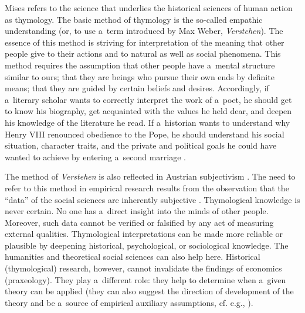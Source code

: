 Mises refers to the science that underlies the historical sciences of human action as thymology. The basic method of thymology is the so-called empathic understanding (or, to use a~term introduced by Max Weber, \textit{Verstehen}). The essence of this method is striving for interpretation of the meaning that other people give to their actions and to natural as well as social phenomena. This method requires the assumption that other people have a~mental structure similar to ours; that they are beings who pursue their own ends by definite means; that they are guided by certain beliefs and desires. Accordingly, if a~literary scholar wants to correctly interpret the work of a~poet, he should get to know his biography, get acquainted with the values he held dear, and deepen his knowledge of the literature he read. If a~historian wants to understand why Henry VIII renounced obedience to the Pope, he should understand his social situation, character traits, and the private and political goals he could have wanted to achieve by entering a~second marriage 
\parencite[][pp.264–284]{mises_theory_2007}.%




The method of \textit{Verstehen} is also reflected in Austrian subjectivism 
\parencite[][]{lachmann_legacy_1971}. %
 The need to refer to this method in empirical research results from the observation that the ``data'' of the social sciences are inherently subjective 
\parencite[][]{hayek_counter-revolution_1952}.%
Thymological knowledge is never certain. No one has a~direct insight into the minds of other people. Moreover, such data cannot be verified or falsified by any act of measuring external qualities. Thymological interpretations can be made more reliable or plausible by deepening historical, psychological, or sociological knowledge. The humanities and theoretical social sciences can also help here. Historical (thymological) research, however, cannot invalidate the findings of economics (praxeology). They play a~different role: they help to determine when a~given theory can be applied (they can also suggest the direction of development of the theory and be a~source of empirical auxiliary assumptions, cf. e.g., 
\parencite[][]{wisniewski_methodology_2014}%
).



